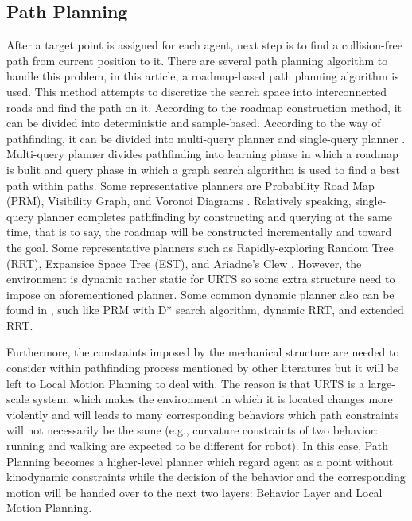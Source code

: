 \documentclass{ieeeaccess}
\begin{document}
\subsection{Path Planning}
After a target point is assigned for each agent, next step is to find a collision-free path from current position to it. There are several path planning algorithm to handle this problem, in this article, a roadmap-based path planning algorithm is used. This method attempts to discretize the search space into interconnected roads and find the path on it. According to the roadmap construction method, it can be divided into deterministic and sample-based. According to the way of pathfinding, it can be divided into multi-query planner and single-query planner \cite{elbanhawi2014sampling}. Multi-query planner divides pathfinding into learning phase in which a roadmap is bulit and query phase in which a graph search algorithm is used to find a best path within paths. Some representative planners are Probability Road Map (PRM), Visibility Graph, and Voronoi Diagrams \cite{liu2018survey}. Relatively speaking, single-query planner completes pathfinding by constructing and querying at the same time, that is to say, the roadmap will be constructed incrementally and toward the goal. Some representative planners such as Rapidly-exploring Random Tree (RRT), Expansice Space Tree (EST), and Ariadne's Clew \cite{elbanhawi2014sampling}. However, the environment is dynamic rather static for URTS so some extra structure need to impose on aforementioned planner. Some common dynamic planner also can be found in \cite{elbanhawi2014sampling}, such like PRM with D* search algorithm, dynamic RRT, and extended RRT.

Furthermore, the constraints imposed by the mechanical structure are needed to consider within pathfinding process mentioned by other literatures but it will be left to Local Motion Planning to deal with. The reason is that URTS is a large-scale system, which makes the environment in which it is located changes more violently and will leads to many corresponding behaviors which path constraints will not necessarily be the same (e.g., curvature constraints of two behavior: running and walking are expected to be different for robot). In this case, Path Planning becomes a higher-level planner which regard agent as a point without kinodynamic constraints while the decision of the behavior and the corresponding motion will be handed over to the next two layers: Behavior Layer and Local Motion Planning.
\end{document}
